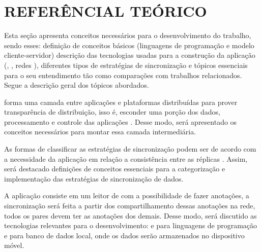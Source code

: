 \section{REFERÊNCIAL TEÓRICO}

Esta seção apresenta conceitos necessários para o desenvolvimento do trabalho, sendo esses: definição de conceitos básicos (linguagens de programação e modelo cliente-servidor) descrição das tecnologias usadas para a construção da aplicação (, , redes ), diferentes tipos de estratégias de sincronização e tópicos essenciais para o seu entendimento tão como comparações com trabalhos relacionados. Segue a descrição geral dos tópicos abordados.

 forma uma camada entre aplicações e plataformas distribuídas para prover transparência de distribuição, isso é, esconder uma porção dos dados, processamento e controle das aplicações \cite{tanenbaum2007dist}. Desse modo, será apresentado os conceitos necessários para montar essa camada intermediária.

As formas de classificar as estratégias de sincronização podem ser de acordo com a necessidade da aplicação em relação a consistência entre as réplicas \cite{tanenbaum2007dist}. Assim, será destacado definições de conceitos essenciais para a categorização e implementação das estratégias de sincronização de dados. 

A aplicação consiste em um leitor de  com a possibilidade de fazer anotações, a sincronização será feita a partir dos compartilhamento dessas anotações na rede, todos os pares devem ter as anotações dos demais. Desse modo, será discutido as tecnologias relevantes para o desenvolvimento:  e  para linguagens de programação e  para banco de dados local, onde os dados serão armazenados no dispositivo móvel.















